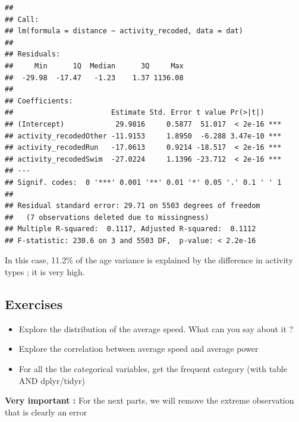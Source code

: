 \documentclass[
]{book}
\newenvironment{Shaded}{\begin{snugshade}}{\end{snugshade}}
\newcommand{\DecValTok}[1]{\textcolor[rgb]{0.00,0.00,0.81}{#1}}
\newcommand{\KeywordTok}[1]{\textcolor[rgb]{0.13,0.29,0.53}{\textbf{#1}}}
\newcommand{\NormalTok}[1]{#1}
\newcommand{\OperatorTok}[1]{\textcolor[rgb]{0.81,0.36,0.00}{\textbf{#1}}}
\newcommand{\StringTok}[1]{\textcolor[rgb]{0.31,0.60,0.02}{#1}}
\providecommand{\tightlist}{%
  \setlength{\itemsep}{0pt}\setlength{\parskip}{0pt}}
\begin{document}
\begin{verbatim}
## 
## Call:
## lm(formula = distance ~ activity_recoded, data = dat)
## 
## Residuals:
##     Min      1Q  Median      3Q     Max 
##  -29.98  -17.47   -1.23    1.37 1136.08 
## 
## Coefficients:
##                       Estimate Std. Error t value Pr(>|t|)    
## (Intercept)            29.9816     0.5877  51.017  < 2e-16 ***
## activity_recodedOther -11.9153     1.8950  -6.288 3.47e-10 ***
## activity_recodedRun   -17.0613     0.9214 -18.517  < 2e-16 ***
## activity_recodedSwim  -27.0224     1.1396 -23.712  < 2e-16 ***
## ---
## Signif. codes:  0 '***' 0.001 '**' 0.01 '*' 0.05 '.' 0.1 ' ' 1
## 
## Residual standard error: 29.71 on 5503 degrees of freedom
##   (7 observations deleted due to missingness)
## Multiple R-squared:  0.1117,	Adjusted R-squared:  0.1112 
## F-statistic: 230.6 on 3 and 5503 DF,  p-value: < 2.2e-16
\end{verbatim}

In this case, 11.2\% of the age variance is explained by the difference in activity types ; it is very high.

\hypertarget{exercises-1}{%
\subsection{Exercises}\label{exercises-1}}

\begin{itemize}
\tightlist
\item
  Explore the distribution of the average speed. What can you say about it ?
\item
  Explore the correlation between average speed and average power
\item
  For all the the categorical variables, get the frequent category (with table AND dplyr/tidyr)
\end{itemize}

\textbf{Very important :} For the next parts, we will remove the extreme observation that is clearly an error

\begin{Shaded}
\end{Shaded}
\end{document}
